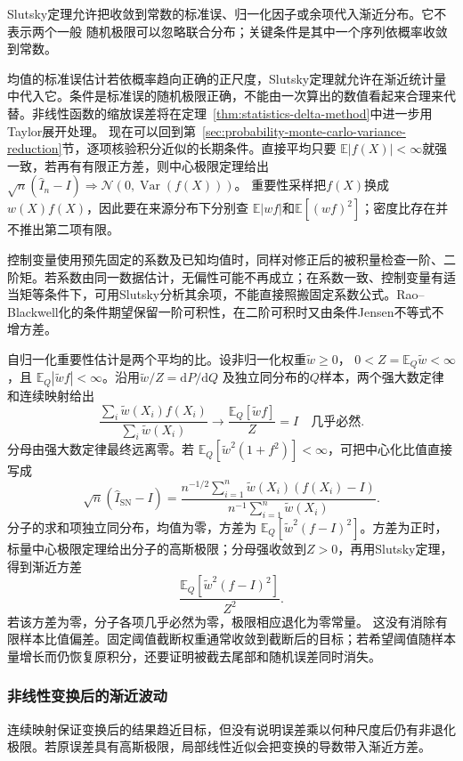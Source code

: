 Slutsky定理允许把收敛到常数的标准误、归一化因子或余项代入渐近分布。它不表示两个一般
随机极限可以忽略联合分布；关键条件是其中一个序列依概率收敛到常数。

均值的标准误估计若依概率趋向正确的正尺度，Slutsky定理就允许在渐近统计量中代入它。条件是标准误的随机极限正确，不能由一次算出的数值看起来合理来代替。非线性函数的缩放误差将在定理~\ref{thm:statistics-delta-method}中进一步用Taylor展开处理。
现在可以回到第~\ref{sec:probability-monte-carlo-variance-reduction}节，逐项核验积分近似的长期条件。直接平均只要
\(\mathbb E|f(X)|<\infty\)就强一致，若再有有限正方差，则中心极限定理给出
\(\sqrt n(\widehat I_n-I)\Rightarrow\mathcal N(0,\operatorname{Var}(f(X)))\)。
重要性采样把\(f(X)\)换成\(w(X)f(X)\)，因此要在来源分布下分别查
\(\mathbb E|wf|\)和\(\mathbb E[(wf)^2]\)；密度比存在并不推出第二项有限。

控制变量使用预先固定的系数及已知均值时，同样对修正后的被积量检查一阶、二阶矩。若系数由同一数据估计，无偏性可能不再成立；在系数一致、控制变量有适当矩等条件下，可用Slutsky分析其余项，不能直接照搬固定系数公式。Rao--Blackwell化的条件期望保留一阶可积性，在二阶可积时又由条件Jensen不等式不增方差。

自归一化重要性估计是两个平均的比。设非归一化权重\(\widetilde w\geq0\)，
\(0<Z=\mathbb E_Q\widetilde w<\infty\)，且
\(\mathbb E_Q|\widetilde wf|<\infty\)。沿用\(\widetilde w/Z=\mathrm dP/\mathrm dQ\)
及独立同分布的\(Q\)样本，两个强大数定律和连续映射给出
\[
\frac{\sum_i\widetilde w(X_i)f(X_i)}
{\sum_i\widetilde w(X_i)}
\longrightarrow
\frac{\mathbb E_Q[\widetilde wf]}Z=I
\quad\text{几乎必然}.
\]
分母由强大数定律最终远离零。若
\(\mathbb E_Q[\widetilde w^2(1+f^2)]<\infty\)，可把中心化比值直接写成
\[
 \sqrt n(\widehat I_{\mathrm{SN}}-I)
 =\frac{n^{-1/2}\sum_{i=1}^n
       \widetilde w(X_i)(f(X_i)-I)}
       {n^{-1}\sum_{i=1}^n\widetilde w(X_i)}.
\]
分子的求和项独立同分布，均值为零，方差为
\(\mathbb E_Q[\widetilde w^2(f-I)^2]\)。方差为正时，标量中心极限定理给出分子的高斯极限；分母强收敛到\(Z>0\)，再用Slutsky定理，得到渐近方差
\[
\frac{\mathbb E_Q[\widetilde w^2(f-I)^2]}{Z^2}.
\]
若该方差为零，分子各项几乎必然为零，极限相应退化为零常量。
这没有消除有限样本比值偏差。固定阈值截断权重通常收敛到截断后的目标；若希望阈值随样本量增长而仍恢复原积分，还要证明被截去尾部和随机误差同时消失。

\subsubsection{非线性变换后的渐近波动}
连续映射保证变换后的结果趋近目标，但没有说明误差乘以何种尺度后仍有非退化极限。若原误差具有高斯极限，局部线性近似会把变换的导数带入渐近方差。

